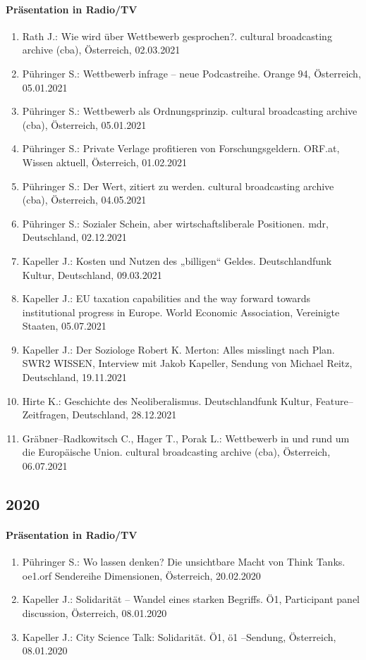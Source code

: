 \paragraph{Präsentation in Radio/TV}
\begin{enumerate}
	\item Rath J.: Wie wird über Wettbewerb gesprochen?. cultural broadcasting archive (cba), Österreich, 02.03.2021
	\item Pühringer S.: Wettbewerb infrage -- neue Podcastreihe. Orange 94, Österreich, 05.01.2021
	\item Pühringer S.: Wettbewerb als Ordnungsprinzip. cultural broadcasting archive (cba), Österreich, 05.01.2021
	\item Pühringer S.: Private Verlage profitieren von Forschungsgeldern. ORF.at, Wissen aktuell, Österreich, 01.02.2021
	\item Pühringer S.: Der Wert, zitiert zu werden. cultural broadcasting archive (cba), Österreich, 04.05.2021
	\item Pühringer S.: Sozialer Schein, aber wirtschaftsliberale Positionen. mdr, Deutschland, 02.12.2021
	\item Kapeller J.: Kosten und Nutzen des „billigen“ Geldes. Deutschlandfunk Kultur, Deutschland, 09.03.2021
	\item Kapeller J.: EU taxation capabilities and the way forward towards institutional progress in Europe. World Economic Association, Vereinigte Staaten, 05.07.2021
	\item Kapeller J.: Der Soziologe Robert K. Merton: Alles misslingt nach Plan. SWR2 WISSEN, Interview mit Jakob Kapeller, Sendung von Michael Reitz, Deutschland, 19.11.2021
	\item Hirte K.: Geschichte des Neoliberalismus. Deutschlandfunk Kultur, Feature--Zeitfragen, Deutschland, 28.12.2021
	\item Gräbner--Radkowitsch C., Hager T., Porak L.: Wettbewerb in und rund um die Europäische Union. cultural broadcasting archive (cba), Österreich, 06.07.2021
\end{enumerate}
\subsection*{2020}
\paragraph{Präsentation in Radio/TV}
\begin{enumerate}
	\item Pühringer S.: Wo lassen denken? Die unsichtbare Macht von Think Tanks. oe1.orf Sendereihe Dimensionen, Österreich, 20.02.2020
	\item Kapeller J.: Solidarität – Wandel eines starken Begriffs. Ö1, Participant panel discussion, Österreich, 08.01.2020
	\item Kapeller J.: City Science Talk: Solidarität. Ö1, ö1  --Sendung, Österreich, 08.01.2020
\end{enumerate}
